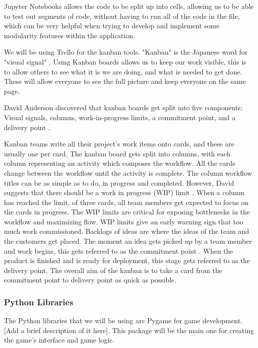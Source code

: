 \documentclass[a4paper,10pt]{article}
\begin{document}
Jupyter Notebooks allows the code to be split up into cells, allowing us to be able to test out segments of code, without having to run all of the code in the file, which can be very helpful when trying to develop and implement some modularity features within the application.

We will be using Trello for the kanban tools. "Kanban" is the Japanese word for "visual signal" \cite{kanbanmeaning}. Using Kanban boards allows us to keep our work visible, this is to allow others to see what it is we are doing, and what is needed to get done. These will allow everyone to see the full picture and keep everyone on the same page.

David Anderson discovered that kanban boards get split into five components: Visual signals, columns, work-in-progress limits, a commitment point, and a delivery point \cite{anderson2010kanban}.

Kanban teams write all their project's work items onto cards, and these are usually one per card. The kanban board gets split into columns, with each column representing an activity which composes the workflow. All the cards change between the workflow until the activity is complete. The column workflow titles can be as simple as to do, in progress and completed. However, David suggests that there should be a work in progress (WIP) limit \cite{anderson2010kanban}. When a column has reached the limit, of three cards, all team members get expected to focus on the cards in progress. The WIP limits are critical for exposing bottlenecks in the workflow and maximizing flow. WIP limits give an early warning sign that too much work commissioned. Backlogs of ideas are where the ideas of the team and the customers get placed. The moment an idea gets picked up by a team member and work begins, this gets referred to as the commitment point \cite{anderson2010kanban}. When the product is finished and is ready for deployment, this stage gets referred to as the delivery point. The overall aim of the kanban is to take a card from the commitment point to delivery point as quick as possible.  

\subsubsection{Python Libraries} %
The Python libraries that we will be using are Pygame for game development. [Add a brief description of it here]. This package will be the main one for creating the game's interface and game logic. 
\end{document}
